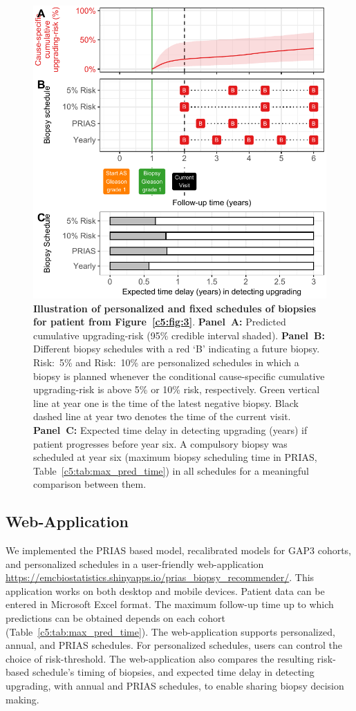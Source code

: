 \begin{figure}
\centerline{\includegraphics{contents/c5/images/c5_fig5.pdf}}
\caption{\textbf{Illustration of personalized and fixed schedules of biopsies for patient from Figure~\ref{c5:fig:3}}. \textbf{Panel~A:} Predicted cumulative upgrading-risk (95\% credible interval shaded). \textbf{Panel~B:} Different biopsy schedules with a red `B' indicating a future biopsy. Risk:~5\% and Risk:~10\% are personalized schedules in which a biopsy is planned whenever the conditional cause-specific cumulative upgrading-risk is above 5\% or 10\% risk, respectively. Green vertical line at year one is the time of the latest negative biopsy. Black dashed line at year two denotes the time of the current visit. \textbf{Panel~C:} Expected time delay in detecting upgrading (years) if patient progresses before year six. A compulsory biopsy was scheduled at year six (maximum biopsy scheduling time in PRIAS, Table~\ref{c5:tab:max_pred_time}) in all schedules for a meaningful comparison between them.}
\label{c5:fig:5}
\end{figure}

\subsection{Web-Application}
We implemented the PRIAS based model, recalibrated models for GAP3 cohorts, and personalized schedules in a user-friendly web-application \url{https://emcbiostatistics.shinyapps.io/prias_biopsy_recommender/}. This application works on both desktop and mobile devices. Patient data can be entered in Microsoft Excel format. The maximum follow-up time up to which predictions can be obtained depends on each cohort (Table~\ref{c5:tab:max_pred_time}). The web-application supports personalized, annual, and PRIAS schedules. For personalized schedules, users can control the choice of risk-threshold. The web-application also compares the resulting risk-based schedule's timing of biopsies, and expected time delay in detecting upgrading, with annual and PRIAS schedules, to enable sharing biopsy decision making.